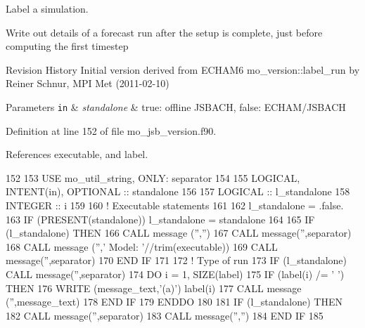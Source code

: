 Label a simulation. 

Write out details of a forecast run after the setup is complete, just before computing the first timestep

\begin{DoxyParagraph}{Revision History}
Initial version derived from E\+C\+H\+A\+M6 mo\+\_\+version\+::label\+\_\+run by Reiner Schnur, M\+P\+I Met (2011-\/02-\/10)
\end{DoxyParagraph}

\begin{DoxyParams}[1]{Parameters}
\mbox{\tt in}  & {\em standalone} & true\+: offline J\+S\+B\+A\+C\+H, false\+: E\+C\+H\+A\+M/\+J\+S\+B\+A\+C\+H \\
\hline
\end{DoxyParams}


Definition at line 152 of file mo\+\_\+jsb\+\_\+version.\+f90.



References executable, and label.


\begin{DoxyCode}
152 
153     \textcolor{keywordtype}{USE }mo\_util\_string\textcolor{keywordtype}{,        ONLY}: separator
154  
155     \textcolor{keywordtype}{LOGICAL}, \textcolor{keywordtype}{INTENT(in)}, \textcolor{keywordtype}{OPTIONAL} :: standalone
156 
157     \textcolor{keywordtype}{LOGICAL} :: l\_standalone
158     \textcolor{keywordtype}{INTEGER} :: i
159 
160     \textcolor{comment}{! Executable statements}
161 
162     l\_standalone = .false.
163     \textcolor{keywordflow}{IF} (\textcolor{keyword}{PRESENT}(standalone)) l\_standalone = standalone
164 
165     \textcolor{keywordflow}{IF} (l\_standalone) \textcolor{keywordflow}{THEN}
166       \textcolor{keyword}{CALL }message (\textcolor{stringliteral}{''},\textcolor{stringliteral}{''})
167       \textcolor{keyword}{CALL }message(\textcolor{stringliteral}{''},separator)
168       \textcolor{keyword}{CALL }message (\textcolor{stringliteral}{''},\textcolor{stringliteral}{' Model: '}//trim(executable))
169       \textcolor{keyword}{CALL }message(\textcolor{stringliteral}{''},separator)
170 \textcolor{keywordflow}{    END IF}
171 
172     \textcolor{comment}{! Type of run}
173     \textcolor{keywordflow}{IF} (l\_standalone) \textcolor{keyword}{CALL }message(\textcolor{stringliteral}{''},separator)
174     \textcolor{keywordflow}{DO} i = 1, \textcolor{keyword}{SIZE}(label)
175       \textcolor{keywordflow}{IF} (label(i) /= \textcolor{stringliteral}{' '}) \textcolor{keywordflow}{THEN}
176         \textcolor{keyword}{WRITE} (message\_text,\textcolor{stringliteral}{'(a)'}) label(i)
177         \textcolor{keyword}{CALL }message (\textcolor{stringliteral}{''},message\_text)
178 \textcolor{keywordflow}{      END IF}
179 \textcolor{keywordflow}{    ENDDO}
180 
181     \textcolor{keywordflow}{IF} (l\_standalone) \textcolor{keywordflow}{THEN}
182       \textcolor{keyword}{CALL }message(\textcolor{stringliteral}{''},separator)
183       \textcolor{keyword}{CALL }message(\textcolor{stringliteral}{''},\textcolor{stringliteral}{''})
184 \textcolor{keywordflow}{    END IF}
185 
\end{DoxyCode}


